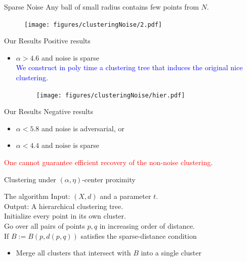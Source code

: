 \documentclass{beamer}
\begin{document}
\begin{frame}{Sparse Noise}
    Any ball of small radius contains few points from $N$.
    \begin{figure}
	  \texttt{[image: figures/clusteringNoise/2.pdf]}
   \end{figure}
    	 
\end{frame}

\begin{frame}{Our Results}
 \alert{Positive results}
 
 \begin{itemize}
  	\item $\alpha > 4.6$ and noise is sparse\\ 
	
	
	\textcolor{blue}{We construct  in poly time a clustering tree that induces the original nice clustering}.
  	
	\begin{figure}
	  \texttt{[image: figures/clusteringNoise/hier.pdf]}
	\end{figure}	  	
  \end{itemize}  
\end{frame}

\begin{frame}{Our Results}
\alert{Negative results}
  \begin{itemize}
  	\vspace{10pt}\item $\alpha < 5.8$ and noise is adversarial, or 
	\vspace{10pt}\item $\alpha < 4.4$ and noise is sparse
\end{itemize}

	 \vspace{30pt}\textcolor{red}{One cannot guarantee efficient recovery of the non-noise clustering}. 
\end{frame}


\begin{frame}{Clustering under $(\alpha, \eta)$-center proximity}
	\begin{block}{The algorithm}
	  Input: $(X, d)$ and a parameter $t$.\\
	  Output: A hierarchical clustering tree.\\
	  \vspace{20pt}Initialize every point in its own cluster.\\
	  \vspace{10pt}Go over all pairs of points $p, q$ in increasing order of distance.\\
	  \vspace{10pt}If $B := B(p, d(p, q))$ satisfies the \alert{sparse-distance condition}
	  \begin{itemize}
	  	\item Merge all clusters that intersect with $B$ into a single cluster
	  \end{itemize}
    \end{block}

\end{frame}
\end{document}
